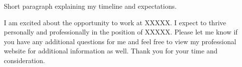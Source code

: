\documentclass[11pt,a4paper,sans]{moderncv}
\begin{document}
	Short paragraph explaining my timeline and expectations. 
	
	\vspace{.5cm} 
	
	I am excited about the opportunity to work at XXXXX. I expect to thrive personally and professionally in the position of XXXXX. Please let me know if you have any additional questions for me and feel free to view my professional website for additional information as well. Thank you for your time and consideration. \\
	
	\vspace{2cm}
	
	\makeletterclosing
	
\end{document}
